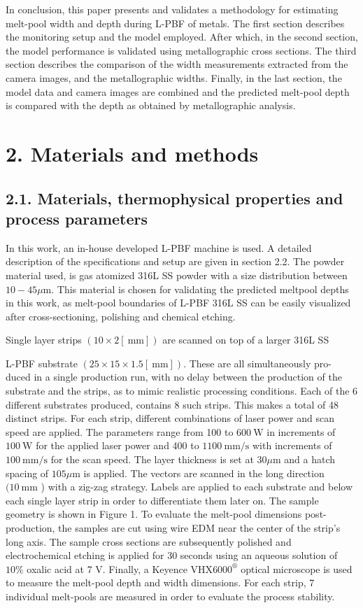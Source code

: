 \documentclass[10pt]{article}
\begin{document}
In conclusion, this paper presents and validates a methodology for estimating melt-pool width and depth during L-PBF of metals. The first section describes the monitoring setup and the model employed. After which, in the second section, the model performance is validated using metallographic cross sections. The third section describes the comparison of the width measurements extracted from the camera images, and the metallographic widths. Finally, in the last section, the model data and camera images are combined and the predicted melt-pool depth is compared with the depth as obtained by metallographic analysis.

\section*{2. Materials and methods}
\subsection*{2.1. Materials, thermophysical properties and process parameters}
In this work, an in-house developed L-PBF machine is used. A detailed description of the specifications and setup are given in section 2.2. The powder material used, is gas atomized 316L SS powder with a size distribution between $10-45 \mu \mathrm{m}$. This material is chosen for validating the predicted meltpool depths in this work, as melt-pool boundaries of L-PBF 316L SS can be easily visualized after cross-sectioning, polishing and chemical etching.

Single layer strips $(10 \times 2[\mathrm{~mm}])$ are scanned on top of a larger 316L SS

L-PBF substrate $(25 \times 15 \times 1.5[\mathrm{~mm}])$. These are all simultaneously pro-\\
duced in a single production run, with no delay between the production of the substrate and the strips, as to mimic realistic processing conditions. Each of the 6 different substrates produced, contains 8 such strips. This makes a total of 48 distinct strips. For each strip, different combinations of laser power and scan speed are applied. The parameters range from 100 to $600 \mathrm{~W}$ in increments of $100 \mathrm{~W}$ for the applied laser power and 400 to $1100 \mathrm{~mm} / \mathrm{s}$ with increments of $100 \mathrm{~mm} / \mathrm{s}$ for the scan speed. The layer thickness is set at $30 \mu \mathrm{m}$ and a hatch spacing of $105 \mu \mathrm{m}$ is applied. The vectors are scanned in the long direction $(10 \mathrm{~mm}$ ) with a zig-zag strategy. Labels are applied to each substrate and below each single layer strip in order to differentiate them later on. The sample geometry is shown in Figure 1. To evaluate the melt-pool dimensions post-production, the samples are cut using wire EDM near the center of the strip's long axis. The sample cross sections are subsequently polished and electrochemical etching is applied for 30 seconds using an aqueous solution of $10 \%$ oxalic acid at 7 V. Finally, a Keyence VHX$6000^{\circledR}$ optical microscope is used to measure the melt-pool depth and width dimensions. For each strip, 7 individual melt-pools are measured in order to evaluate the process stability.
\end{document}
